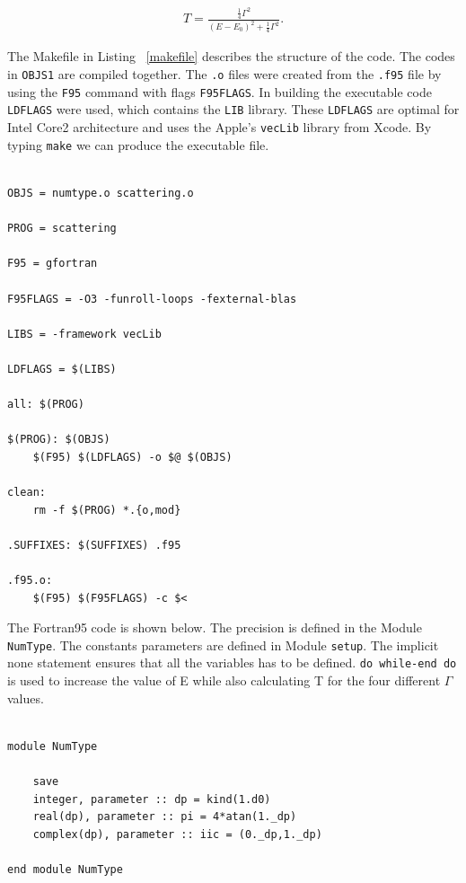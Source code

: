 \documentclass[12pt]{article}
\begin{document}
\begin{gather}
T = \frac{\frac{1}{4}\Gamma^2}{(E-E_0)^2 + \frac{1}{4}\Gamma^2}.
\end{gather}

The Makefile in Listing \ \ref{makefile} describes the structure of the code. The codes in {\tt OBJS1} are 
compiled together. The {\tt .o} files were created from the {\tt .f95} file by using the {\tt F95} command
with flags {\tt F95FLAGS}. In building the executable code {\tt LDFLAGS} were used, which contains 
the {\tt LIB} library. These {\tt LDFLAGS} are optimal for Intel Core2 architecture and uses the 
Apple's {\tt vecLib} library from Xcode. By typing {\tt make} we can produce the executable file.





\begin{lstlisting}[frame=single,caption={Typical {\tt Makefile}},label=makefile]

OBJS = numtype.o scattering.o 

PROG = scattering

F95 = gfortran

F95FLAGS = -O3 -funroll-loops -fexternal-blas

LIBS = -framework vecLib

LDFLAGS = $(LIBS)

all: $(PROG) 

$(PROG): $(OBJS)
	$(F95) $(LDFLAGS) -o $@ $(OBJS) 

clean:
	rm -f $(PROG) *.{o,mod}

.SUFFIXES: $(SUFFIXES) .f95

.f95.o:
	$(F95) $(F95FLAGS) -c $<

\end{lstlisting}

The Fortran95 code is shown below. The precision is defined in the Module {\tt NumType}. The constants parameters are defined in Module {\tt setup}. The implicit none statement ensures that all the variables has to be defined. {\tt do while-end do} is used to increase the value of E while also calculating T for the four different $\Gamma$ values. 


\begin{lstlisting}[frame=single,caption={Module {\tt NumType}},label=module]

module NumType

	save
	integer, parameter :: dp = kind(1.d0)
	real(dp), parameter :: pi = 4*atan(1._dp)
	complex(dp), parameter :: iic = (0._dp,1._dp)
	
end module NumType

\end{lstlisting}
\end{document}
